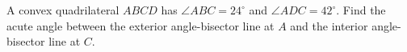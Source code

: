 A convex quadrilateral $ABCD$ has $\angle ABC=24^\circ$ and $\angle ADC=42^\circ$. Find the acute angle between the exterior angle-bisector line at $A$ and the interior angle-bisector line at $C$.
